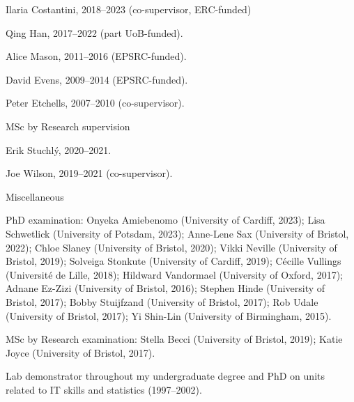 \documentclass[a4paper, 10pt]{article}
\renewenvironment{itemize}{
  \begin{list}{}{
    \setlength{\leftmargin}{1.5em}
  }
}{
  \end{list}
}
\begin{document}
\begin{itemize}
\begin{itemize}
    \item Ilaria Costantini, 2018--2023 (co-supervisor, ERC-funded)
    \item Qing Han, 2017--2022 (part UoB-funded).
    \item Alice Mason, 2011--2016 (EPSRC-funded).
    \item David Evens, 2009--2014 (EPSRC-funded).
    \item Peter Etchells, 2007--2010 (co-supervisor).
    \end{itemize}
\item{MSc by Research supervision}
	\begin{itemize}
		\item Erik Stuchl\'y, 2020--2021.
		\item Joe Wilson, 2019--2021 (co-supervisor).
	\end{itemize}
\item Miscellaneous
	\begin{itemize}
	\item PhD examination: Onyeka Amiebenomo (University of Cardiff, 2023); Lisa Schwetlick (University of Potsdam, 2023); Anne-Lene Sax (University of Bristol, 2022); Chloe Slaney (University of Bristol, 2020); Vikki Neville (University of Bristol, 2019); Solveiga Stonkute (University of Cardiff, 2019); C{\'e}cille Vullings (Universit\'e de Lille, 2018); Hildward Vandormael (University of Oxford, 2017); Adnane Ez-Zizi (University of Bristol, 2016); Stephen Hinde (University of Bristol, 2017); Bobby Stuijfzand (University of Bristol, 2017); Rob Udale (University of Bristol, 2017); Yi Shin-Lin (University of Birmingham, 2015).
	\item MSc by Research examination: Stella Becci (University of Bristol, 2019); Katie Joyce (University of Bristol, 2017).
    \item Lab demonstrator throughout my undergraduate degree and PhD on units related to IT skills and statistics (1997--2002).
	\end{itemize}
\end{itemize}
\end{document}
